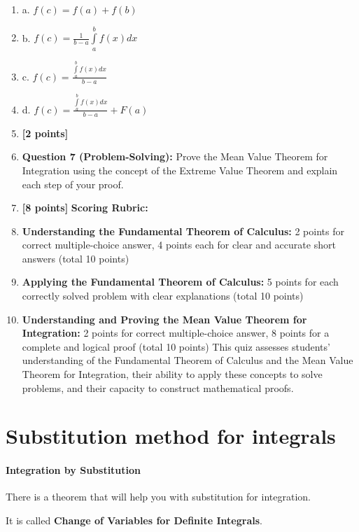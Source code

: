 \begin{enumerate}
    \item a. $f(c) = f(a) + f(b)$
    \item b. $f(c) = \frac{1}{b-a} \int\limits_a^b f(x)dx$
    \item c. $f(c) = \frac{\int\limits_a^b f(x)dx}{b-a}$
    \item d. $f(c) = \frac{\int\limits_a^b f(x)dx}{b-a} + F(a)$
    \item \textbf{[2 points]}
    \item \textbf{Question 7 (Problem-Solving):} Prove the Mean Value Theorem for Integration using the concept of the Extreme Value Theorem and explain each step of your proof.
    \item \textbf{[8 points]} \textbf{Scoring Rubric:}
    \item \textbf{Understanding the Fundamental Theorem of Calculus:} 2 points for correct multiple-choice answer, 4 points each for clear and accurate short answers (total 10 points)
    \item \textbf{Applying the Fundamental Theorem of Calculus:} 5 points for each correctly solved problem with clear explanations (total 10 points)
    \item \textbf{Understanding and Proving the Mean Value Theorem for Integration:} 2 points for correct multiple-choice answer, 8 points for a complete and logical proof (total 10 points) This quiz assesses students' understanding of the Fundamental Theorem of Calculus and the Mean Value Theorem for Integration, their ability to apply these concepts to solve problems, and their capacity to construct mathematical proofs.
\end{enumerate}

\section{Substitution method for integrals}
\label{sec:substitution-method-for-integrals}

\paragraph{Integration by Substitution}



There is a theorem that will help you with substitution for integration.

It is called \textbf{Change of Variables for Definite Integrals}.




